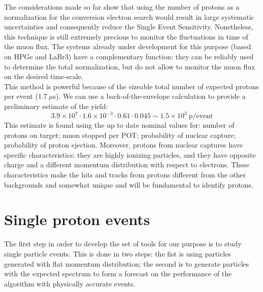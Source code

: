 \documentclass[12pt,a4paper,openright, oneside, titlepage]{book} %
\begin{document}
\noindent 
The considerations made so far show that using the number of protons 
as a normalization for the conversion electron search would result 
in large systematic uncertainties and consequently reduce the Single Event Sensitivity. 
Nonetheless, this technique is still extremely precious 
to monitor the fluctuations in time of the muon flux. 
The systems already under development for this purpose (based on HPGe and LaBr3) 
have a complementary function: 
they can be reliably used to determine the total normalization, 
but do not allow to monitor the muon flux on the desired time-scale.\\
This method is powerful because of the sizeable total number of expected protons per event ($1.7\ \mu$s). 
We can use a back-of-the-envelope calculation to provide a preliminary estimate of the yield:
$$3.9\times10^7 \cdot 1.6\times10^{-3} \cdot 0.61 \cdot 0.045 \sim 1.5\times10^3\ \text{p/event}$$
This estimate is found using the up to date nominal values for: number of protons on target; muon stopped per POT; probability of nuclear capture; probability of proton ejection.
Moreover, protons from nuclear captures have specific characteristics:
they are highly ionizing particles, 
and they have opposite charge and a different momentum distribution 
with respect to electrons. 
These characteristics make the hits and tracks from protons different 
from the other backgrounds and somewhat unique and will be fundamental 
to identify protons.

\section{Single proton events}
The first step in order to develop the set of tools for our purpose is to study single particle events. 
This is done in two steps: the fist is using particles generated with flat momentum distribution; the second is to generate particles with the expected spectrum to form a forecast on the performance of the algorithm with physically accurate events.
\end{document}
